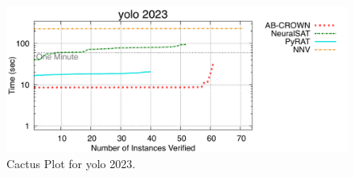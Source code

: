 \begin{figure}[h]
\centerline{\includegraphics[width=\textwidth]{cactus/2025_yolo_2023.pdf}}
\caption{Cactus Plot for yolo 2023.}
\label{fig:quantPic}
\end{figure}

